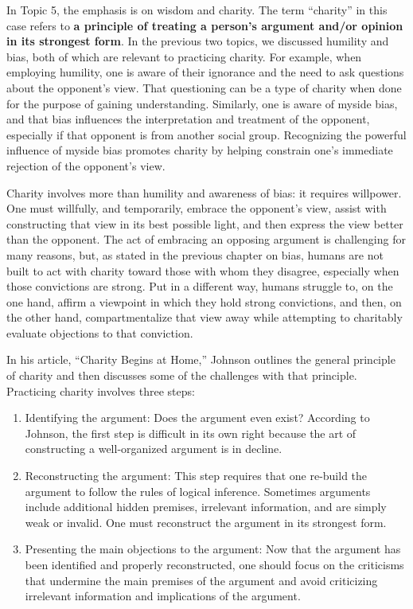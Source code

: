 \documentclass[
]{book}
\providecommand{\tightlist}{%
  \setlength{\itemsep}{0pt}\setlength{\parskip}{0pt}}
\begin{document}
In Topic 5, the emphasis is on wisdom and charity. The term ``charity'' in this case refers to \textbf{a principle of treating a person's argument and/or opinion in its strongest form}. In the previous two topics, we discussed humility and bias, both of which are relevant to practicing charity. For example, when employing humility, one is aware of their ignorance and the need to ask questions about the opponent's view. That questioning can be a type of charity when done for the purpose of gaining understanding. Similarly, one is aware of myside bias, and that bias influences the interpretation and treatment of the opponent, especially if that opponent is from another social group. Recognizing the powerful influence of myside bias promotes charity by helping constrain one's immediate rejection of the opponent's view.

Charity involves more than humility and awareness of bias: it requires willpower. One must willfully, and temporarily, embrace the opponent's view, assist with constructing that view in its best possible light, and then express the view better than the opponent. The act of embracing an opposing argument is challenging for many reasons, but, as stated in the previous chapter on bias, humans are not built to act with charity toward those with whom they disagree, especially when those convictions are strong. Put in a different way, humans struggle to, on the one hand, affirm a viewpoint in which they hold strong convictions, and then, on the other hand, compartmentalize that view away while attempting to charitably evaluate objections to that conviction.

In his article, ``Charity Begins at Home,'' Johnson outlines the general principle of charity and then discusses some of the challenges with that principle. Practicing charity involves three steps:

\begin{enumerate}
\def\labelenumi{\arabic{enumi}.}
\tightlist
\item
  Identifying the argument: Does the argument even exist? According to Johnson, the first step is difficult in its own right because the art of constructing a well-organized argument is in decline.
\item
  Reconstructing the argument: This step requires that one re-build the argument to follow the rules of logical inference. Sometimes arguments include additional hidden premises, irrelevant information, and are simply weak or invalid. One must reconstruct the argument in its strongest form.
\item
  Presenting the main objections to the argument: Now that the argument has been identified and properly reconstructed, one should focus on the criticisms that undermine the main premises of the argument and avoid criticizing irrelevant information and implications of the argument.
\end{enumerate}
\end{document}
